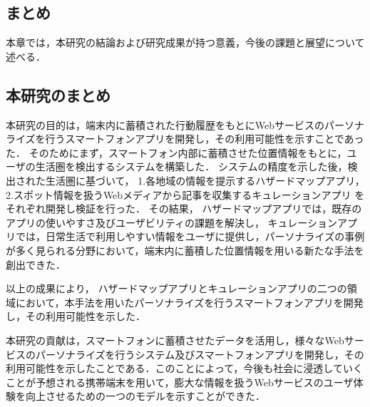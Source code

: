 \documentclass[a4paper]{jsarticle}
\begin{document}
\begin{enumerate}
\begin{enumerate}
\section{まとめ}
本章では，本研究の結論および研究成果が持つ意義，今後の課題と展望について述べる．

\subsection{本研究のまとめ}
本研究の目的は，端末内に蓄積された行動履歴をもとにWebサービスのパーソナライズを行うスマートフォンアプリを開発し，その利用可能性を示すことであった．
そのためにまず，スマートフォン内部に蓄積させた位置情報をもとに，ユーザの生活圏を検出するシステムを構築した．
システムの精度を示した後，検出された生活圏に基づいて，
1.各地域の情報を提示するハザードマップアプリ，
2.スポット情報を扱うWebメディアから記事を収集するキュレーションアプリ
をそれぞれ開発し検証を行った．
その結果，
ハザードマップアプリでは，既存のアプリの使いやすさ及びユーザビリティの課題を解決し，
キュレーションアプリでは，日常生活で利用しやすい情報をユーザに提供し，パーソナライズの事例が多く見られる分野において，端末内に蓄積した位置情報を用いる新たな手法を創出できた．

以上の成果により，
ハザードマップアプリとキュレーションアプリの二つの領域において，本手法を用いたパーソナライズを行うスマートフォンアプリを開発し，その利用可能性を示した．

本研究の貢献は，スマートフォンに蓄積させたデータを活用し，様々なWebサービスのパーソナライズを行うシステム及びスマートフォンアプリを開発し，その利用可能性を示したことである．このことによって，今後も社会に浸透していくことが予想される携帯端末を用いて，膨大な情報を扱うWebサービスのユーザ体験を向上させるための一つのモデルを示すことができた．



\end{enumerate}
\end{enumerate}
\end{document}
